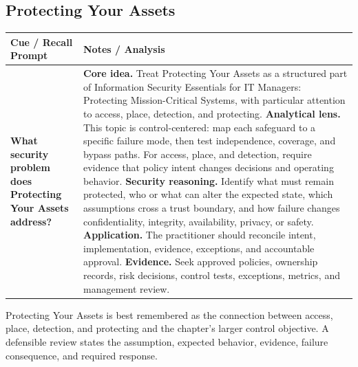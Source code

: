 \documentclass[11pt]{article}
\newcommand{\CornellHeader}{%
\rowcolor{Navy}\color{white}\bfseries Cue / Recall Prompt & \color{white}\bfseries Notes / Analysis\\\hline}
\newcommand{\CornellRow}[2]{%
\cellcolor{CueGray}\RaggedRight\textbf{#1} & \RaggedRight #2\\\hline}
\begin{document}
\subsection*{Protecting Your Assets}
\begin{longtable}{>{\RaggedRight\arraybackslash}p{}|>{\RaggedRight\arraybackslash}p{}}
\CornellHeader
\CornellRow{What security problem does Protecting Your Assets address?}{\textbf{Core idea.} Treat Protecting Your Assets as a structured part of Information Security Essentials for IT Managers: Protecting Mission-Critical Systems, with particular attention to access, place, detection, and protecting. \textbf{Analytical lens.} This topic is control-centered: map each safeguard to a specific failure mode, then test independence, coverage, and bypass paths. For access, place, and detection, require evidence that policy intent changes decisions and operating behavior. \textbf{Security reasoning.} Identify what must remain protected, who or what can alter the expected state, which assumptions cross a trust boundary, and how failure changes confidentiality, integrity, availability, privacy, or safety. \textbf{Application.} The practitioner should reconcile intent, implementation, evidence, exceptions, and accountable approval. \textbf{Evidence.} Seek approved policies, ownership records, risk decisions, control tests, exceptions, metrics, and management review.}
\end{longtable}
\begin{topicsummary}
Protecting Your Assets is best remembered as the connection between access, place, detection, and protecting and the chapter's larger control objective. A defensible review states the assumption, expected behavior, evidence, failure consequence, and required response.
\end{topicsummary}
\end{document}
